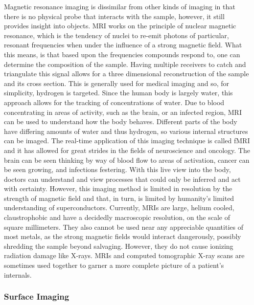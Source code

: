 Magnetic resonance imaging is dissimilar from other kinds of imaging in that there is no physical probe that interacts with the sample, however, it still provides insight into objects. MRI works on the principle of nuclear magnetic resonance, which is the tendency of nuclei to re-emit photons of particular, resonant frequencies when under the influence of a strong magnetic field. What this means, is that based upon the frequencies compounds respond to, one can determine the composition of the sample. Having multiple receivers to catch and triangulate this signal allows for a three dimensional reconstruction of the sample and its cross section. This is generally used for medical imaging and so, for simplicity, hydrogen is targeted. Since the human body is largely water, this approach allows for the tracking of concentrations of water. Due to blood concentrating in areas of activity, such as the brain, or an infected region, MRI can be used to understand how the body behaves. Different parts of the body have differing amounts of water and thus hydrogen, so various internal structures can be imaged. The real-time application of this imaging technique is called fMRI and it has allowed for great strides in the fields of neuroscience and oncology. The brain can be seen thinking by way of blood flow to areas of activation, cancer can be seen growing, and infections festering. With this live view into the body, doctors can understand and view processes that could only be inferred and act with certainty. However, this imaging method is limited in resolution by the strength of magnetic field and that, in turn, is limited by humanity's limited understanding of superconductors. Currently, MRIs are large, helium cooled, claustrophobic and have a decidedly macroscopic resolution, on the scale of square millimeters. They also cannot be used near any appreciable quantities of most metals, as the strong magnetic fields would interact dangerously, possibly shredding the sample beyond salvaging. However, they do not cause ionizing radiation damage like X-rays. MRIs and computed tomographic X-ray scans are sometimes used together to garner a more complete picture of a patient's internals.

\subsubsection{Surface Imaging}

